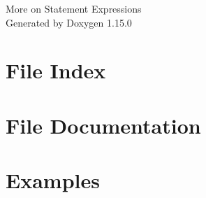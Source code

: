 \documentclass[twoside]{book}
\newcommand{\+}{\discretionary{\mbox{\scriptsize$\hookleftarrow$}}{}{}}
\newcommand{\clearemptydoublepage}{%
    \newpage{\pagestyle{empty}\cleardoublepage}%
  }
\begin{document}
  \raggedbottom
    \hypersetup{pageanchor=false,
                bookmarksnumbered=true,
                pdfencoding=unicode
               }
  \begin{titlepage}
  \vspace*{7cm}
  \begin{center}%
  {\Large More on Statement Expressions}\\
  \vspace*{1cm}
  {\large Generated by Doxygen 1.15.0}\\
  \end{center}
  \end{titlepage}
  \clearemptydoublepage
  \tableofcontents
  \clearemptydoublepage
  \hypersetup{pageanchor=true}
\chapter{File Index}

\chapter{File Documentation}



\chapter{Examples}

  \backmatter
  \newpage
  \clearemptydoublepage
  \printindex
\end{document}
